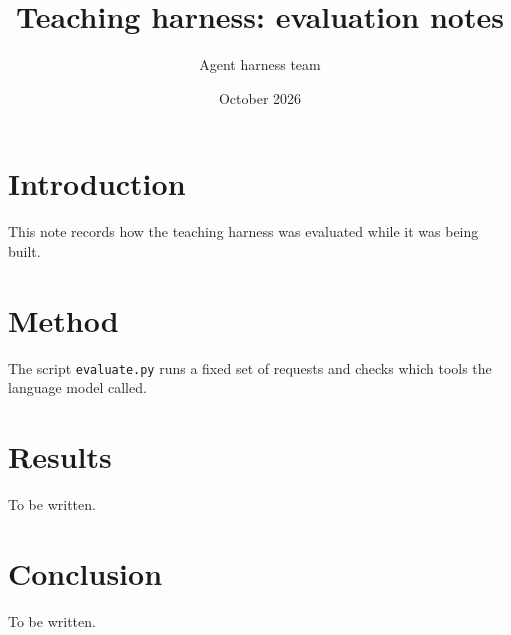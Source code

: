 \documentclass[11pt]{article}
\title{Teaching harness: evaluation notes}
\author{Agent harness team}
\date{October 2026}
\begin{document}
\maketitle

\section{Introduction}
This note records how the teaching harness was evaluated while it was being built.

\section{Method}
The script \texttt{evaluate.py} runs a fixed set of requests and checks which tools the language model called.

\section{Results}
To be written.

\section{Conclusion}
To be written.
\end{document}
